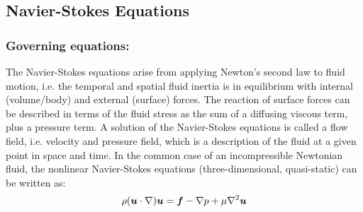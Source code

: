 \subsection{Navier-Stokes Equations} 

\subsubsection{Governing equations:}

The Navier-Stokes equations arise from applying Newton's second law to fluid motion, i.e. the temporal and spatial fluid inertia is in equilibrium with internal (volume/body)  and external (surface) forces. The reaction of surface forces can be described in terms of the fluid stress as the sum of a diffusing viscous term, plus a pressure term. A solution of the Navier-Stokes equations is called a flow field, i.e. velocity and pressure field, which is a description of the fluid at a given point in space and time.  In the common case of an incompressible Newtonian fluid, the nonlinear Navier-Stokes equations (three-dimensional, quasi-static) can be written as:
\begin{equation}
    \rho(\vect{u}\cdot\grad)\vect{u}=\vect{f}-\grad{p}+\mu\laplacian{\vect{u}}
  \label{eqn:NavierStokesequation1}
\end{equation}

